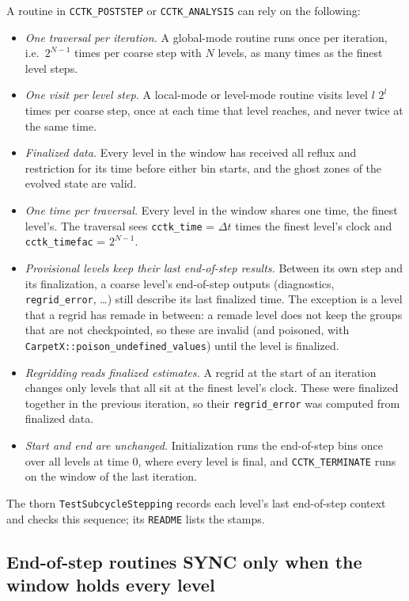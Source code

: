 A routine in \texttt{CCTK\_POSTSTEP} or \texttt{CCTK\_ANALYSIS} can rely on the following:
%
\begin{itemize}
\item \emph{One traversal per iteration.} A global-mode routine runs once per iteration, i.e.\ $2^{N-1}$ times per coarse step with $N$ levels, as many times as the finest level steps.
\item \emph{One visit per level step.} A local-mode or level-mode routine visits level $l$ $2^l$ times per coarse step, once at each time that level reaches, and never twice at the same time.
\item \emph{Finalized data.} Every level in the window has received all reflux and restriction for its time before either bin starts, and the ghost zones of the evolved state are valid.
\item \emph{One time per traversal.} Every level in the window shares one time, the finest level's. The traversal sees \texttt{cctk\_time} = $\Delta t$ times the finest level's clock and \texttt{cctk\_timefac} = $2^{N-1}$.
\item \emph{Provisional levels keep their last end-of-step results.} Between its own step and its finalization, a coarse level's end-of-step outputs (diagnostics, \texttt{regrid\_error}, \ldots) still describe its last finalized time. The exception is a level that a regrid has remade in between: a remade level does not keep the groups that are not checkpointed, so these are invalid (and poisoned, with \texttt{CarpetX::poison\_undefined\_values}) until the level is finalized.
\item \emph{Regridding reads finalized estimates.} A regrid at the start of an iteration changes only levels that all sit at the finest level's clock. These were finalized together in the previous iteration, so their \texttt{regrid\_error} was computed from finalized data.
\item \emph{Start and end are unchanged.} Initialization runs the end-of-step bins once over all levels at time 0, where every level is final, and \texttt{CCTK\_TERMINATE} runs on the window of the last iteration.
\end{itemize}

The thorn \texttt{TestSubcycleStepping} records each level's last end-of-step context and checks this sequence; its \texttt{README} lists the stamps.

\subsection{End-of-step routines SYNC only when the window holds every level}
\label{sec:end_of_step_sync}

